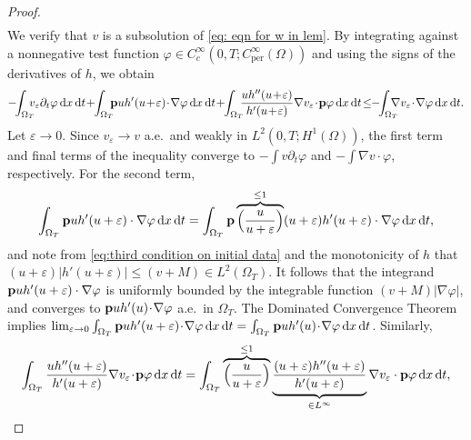 \documentclass[11pt,a4paper,reqno]{amsart}
\theoremstyle{remark}
\theoremstyle{definition}
\numberwithin{equation}{section}
\newcommand{\per}{\mathrm{per}}
\newcommand{\p}{{\bf p}}
\renewcommand{\d}{\, \mathrm{d} }
\begin{document}
\begin{proof}
\begin{equation}
\begin{aligned}
    \end{aligned}
\end{equation}
We verify that $v$ is a subsolution of \eqref{eq: eqn for w in lem}. By integrating against a nonnegative test function $\varphi \in C^\infty_c(0,T;C^\infty_\per(\Omega))$ and using the signs of the derivatives of $h$, we obtain 
\begin{equation*}
   \begin{aligned} -\!\!\int_{\Omega_T} \!\!\!\! v_\varepsilon \partial_t \varphi \d x \d t \! + \!\! \int_{\Omega_T}\!\!\! \p u h'(u\!+\!\varepsilon)\! \cdot\! \nabla \varphi  \d x \d t \! + \! \! \int_{\Omega_T} \!\!\!\frac{u h''(u\!+\!\varepsilon)}{h'(u\!+\!\varepsilon)} \nabla v_\varepsilon \!\cdot \! \p \varphi \d x \d t \!\leq\! \! -\!\! \int_{\Omega_T} \!\!\!\!\!\nabla v_\varepsilon\!\cdot\!\nabla \varphi \d x \d t. 
   \end{aligned}
\end{equation*}
Let $\varepsilon \to 0$. Since $v_\varepsilon \to v$ a.e.~and weakly in $L^2(0,T;H^1(\Omega))$, the first term and final terms of the inequality converge to $-\int v \partial_t \varphi$ and $-\int \nabla v \!\cdot\! \varphi$, respectively. For the second term, 
\begin{equation*}
    \begin{aligned}
        \int_{\Omega_T} \p u h'(u+\varepsilon) \cdot \nabla \varphi  \d x \d t = \int_{\Omega_T} \p \overbrace{\Big( \frac{u}{u+\varepsilon}\Big)}^{\leq 1}  (u+\varepsilon) h'(u+\varepsilon)  \cdot \nabla \varphi  \d x \d t, 
    \end{aligned}
\end{equation*}
and note from \eqref{eq:third condition on initial data} and the monotonicity of $h$ that $(u+\varepsilon) |h'(u+\varepsilon)| \leq (v+M) \in L^2(\Omega_T).$ It follows that the integrand $\p u h'(u+\varepsilon) \cdot \nabla \varphi$ is uniformly bounded by the integrable function $(v+M)|\nabla \varphi|$, and converges to $\p u h'(u) \!\cdot\! \nabla \varphi$ a.e.~in $\Omega_T$. The Dominated Convergence Theorem implies $\lim_{\varepsilon \to 0}\int_{\Omega_T} \p u h'(u+\varepsilon) \!\cdot\! \nabla \varphi  \d x \d t = \int_{\Omega_T} \p u h'(u) \!\cdot \!\nabla \varphi  \d x \d t$. Similarly, 
\begin{equation*}
    \int_{\Omega_T} \frac{u h''(u+\varepsilon)}{h'(u+\varepsilon)} \nabla v_\varepsilon \! \cdot \! \p \varphi \d x \d t = \int_{\Omega_T} \overbrace{\Big( \frac{u}{u+\varepsilon} \Big)}^{\leq 1} \underbrace{\frac{(u+\varepsilon) h''(u+\varepsilon)}{h'(u+\varepsilon)}}_{\in L^\infty } \nabla v_\varepsilon \cdot \p \varphi \d x \d t, 

\end{equation*}
\end{proof}
\end{document}
